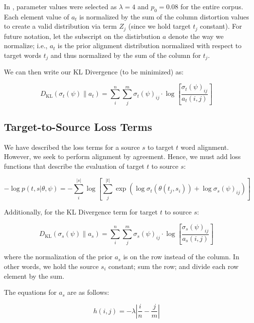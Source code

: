 \documentclass[twoside,twocolumn]{article}
\newlength\mystoreparindent
\newenvironment{myparindent}[1]{%
  \setlength{\mystoreparindent}{\the\parindent}
  \setlength{\parindent}{#1}
  }{%
  \setlength{\parindent}{\mystoreparindent}
}
\begin{document}
\begin{myparindent}{0pt}
In \cite{dyer2013simple}, parameter values were selected as
$\lambda = 4$ and $p_0 = 0.08$ for the entire corpus.
Each element value of $a_t$ is normalized by the sum of the column distortion
values to create a valid distribution via term $Z_j$ (since we hold target $t_j$ constant). For future notation, let the subscript on the distirbution $a$ denote
the way we normalize; i.e., $a_t$ is the prior alignment distribution normalized
with respect to target words $t_j$ and thus normalized by the sum of the column
for $t_j$.

We can then write our KL Divergence (to be minimized) as:

\begin{equation}
  D_{\mathrm{KL}}(\sigma_t(\psi) \| a_t) =
    \sum_i^n \sum_j^m \sigma_t(\psi)_{ij} \cdot
      \log \left[ \frac{\sigma_t(\psi)_{ij}}{a_t(i, j)} \right]
\end{equation}


\subsection{Target-to-Source Loss Terms}

We have described the loss terms for a source $s$ to target $t$ word alignment.
However, we seek to perform alignment by agreement. Hence, we must add loss
functions that describe the evaluation of target $t$ to source $s$:

\begin{equation}
  -\log  p(t , s | \theta, \psi) =
  - \sum_i^{|s|}  \log \left[ \sum_j^{|t|}
      \exp \left(
        \log \sigma_t(\theta(t_j, s_i)) + \log \sigma_s(\psi)_{ij}
      \right)
    \right]
\end{equation}

\noindent
Additionally, for the KL Divergence term for target $t$ to source $s$:

\begin{equation}
D_{\mathrm{KL}} (\sigma_s(\psi) \| a_s) = \sum_i^n \sum_j^m \sigma_s(\psi)_{ij}
  \cdot \log \left[ \frac{\sigma_s(\psi)_{ij}}{a_s(i, j)} \right]
\end{equation}

\noindent
where the normalization of the prior $a_s$ is on the row instead of the column.
In other words, we hold the source $s_i$ constant; sum the row; and divide each
row element by the sum.

The equations for $a_s$ are as follows:

\begin{equation}
  h(i, j) = {-\lambda \left| \frac{i}{n} - \frac{j}{m}\right|}
\end{equation}


\end{myparindent}
\end{document}
